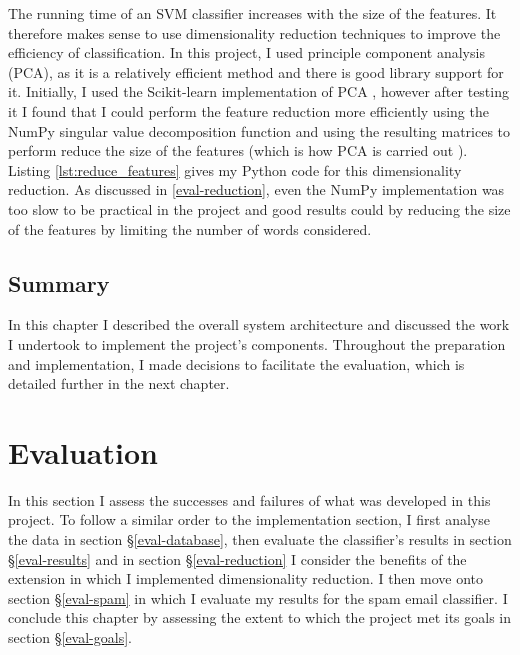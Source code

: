 \documentclass[12pt,a4paper,twoside,openright]{report}
\newcommand{\mylisting}[4]{}
\newcommand{\pylisting}[2]{\mylisting{Python}{py}{#1}{#2}}
\begin{document}
The running time of an SVM classifier increases with the size of the features. It therefore makes sense to use dimensionality reduction techniques to improve the efficiency of classification. In this project, I used principle component analysis (PCA), as it is a relatively efficient method and there is good library support for it. Initially, I used the Scikit-learn implementation of PCA \cite{sklearnpca}, however after testing it I found that I could perform the feature reduction more efficiently using the NumPy singular value decomposition function \cite{numpysvd} and using the resulting matrices to perform reduce the size of the features (which is how PCA is carried out \cite{svd}). Listing \ref{lst:reduce_features} gives my Python code for this dimensionality reduction. As discussed in \ref{eval-reduction}, even the NumPy implementation was too slow to be practical in the project and good results could by reducing the size of the features by limiting the number of words considered.

\pylisting{A function using NumPy array operations to perform singular value decomposition on two sets of given features}{reduce_features}

\section{Summary}

In this chapter I described the overall system architecture and discussed the work I undertook to implement the project's components. Throughout the preparation and implementation, I made decisions to facilitate the evaluation, which is detailed further in the next chapter.

\chapter{Evaluation} \label{eval}

In this section I assess the successes and failures of what was developed in this project. To follow a similar order to the implementation section, I first analyse the data in section \S\ref{eval-database}, then evaluate the classifier's results in section \S\ref{eval-results} and in section \S\ref{eval-reduction} I consider the benefits of the extension in which I implemented dimensionality reduction. I then move onto section \S\ref{eval-spam} in which I evaluate my results for the spam email classifier. I conclude this chapter by assessing the extent to which the project met its goals in section \S\ref{eval-goals}.
\end{document}
